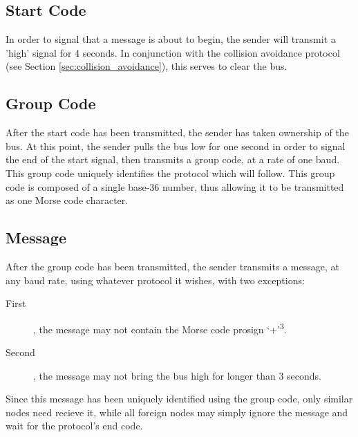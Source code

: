 \documentclass[11pt]{article}
\begin{document}
\subsection{Start Code}

In order to signal that a message is about to begin, the sender will transmit a 'high' signal for 4 seconds. In conjunction with the collision avoidance protocol (see Section \ref{sec:collision_avoidance}), this serves to clear the bus.

\subsection{Group Code}

After the start code has been transmitted, the sender has taken ownership of the bus. At this point, the sender pulls the bus low for one second in order to signal the end of the start signal, then transmits a group code, at a rate of one baud. This group code uniquely identifies the protocol which will follow. This group code is composed of a single base-36 number, thus allowing it to be transmitted as one Morse code character.

\subsection{Message}

After the group code has been transmitted, the sender transmits a message, at any baud rate, using whatever protocol it wishes, with two exceptions:
\begin{description}
\item[First]\hspace{-6pt}, the message may not contain the Morse code prosign `+'\textsuperscript{3}.
\item[Second]\hspace{-6pt}, the message may not bring the bus high for longer than 3 seconds.
\end{description}

Since this message has been uniquely identified using the group code, only similar nodes need recieve it, while all foreign nodes may simply ignore the message and wait for the protocol's end code.
\end{document}
